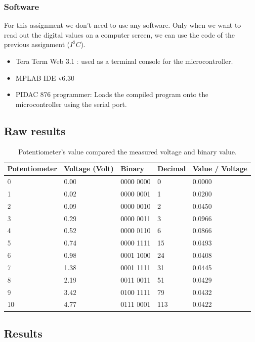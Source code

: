 \documentclass[a4paper, 12pt, titlepage]{article}
\begin{document}
\subsubsection{Software}
For this assignment we don't need to use any software. Only when we want to read out the digital values on a computer screen, we can use the code of the previous assignment ($I^{2}C$).
\begin{itemize}
\item Tera Term Web 3.1 : used as a terminal console for the microcontroller.
\item MPLAB IDE v6.30
\item PIDAC 876 programmer: Loads the compiled program onto the microcontroller
using the serial port.
\end{itemize}

\subsection{Raw results} %


\begin{table}[H]
\centering
\begin{tabular}{|l|l|l|l|l|} \hline
Potentiometer & Voltage (Volt) & Binary & Decimal & Value / Voltage\\ \hline
 0 & 0.00 & 0000 0000 & 0 & 0.0000 \\ \hline
 1 & 0.02 & 0000 0001 & 1 & 0.0200 \\ \hline
 2 & 0.09 & 0000 0010 & 2 & 0.0450 \\ \hline
 3 & 0.29 & 0000 0011 & 3 & 0.0966 \\ \hline
 4 & 0.52 & 0000 0110 & 6 & 0.0866 \\ \hline
 5 & 0.74 & 0000 1111 & 15 & 0.0493 \\ \hline
 6 & 0.98 & 0001 1000 & 24 & 0.0408 \\ \hline
 7 & 1.38 & 0001 1111 & 31 & 0.0445 \\ \hline
 8 & 2.19 & 0011 0011 & 51 & 0.0429 \\ \hline
 9 & 3.42 & 0100 1111 & 79 & 0.0432 \\ \hline
10 & 4.77 & 0111 0001 & 113 & 0.0422 \\ \hline
\end{tabular}
\caption{Potentiometer's value compared the measured voltage and binary value.}
\end{table}



\subsection{Results} %
\end{document}
